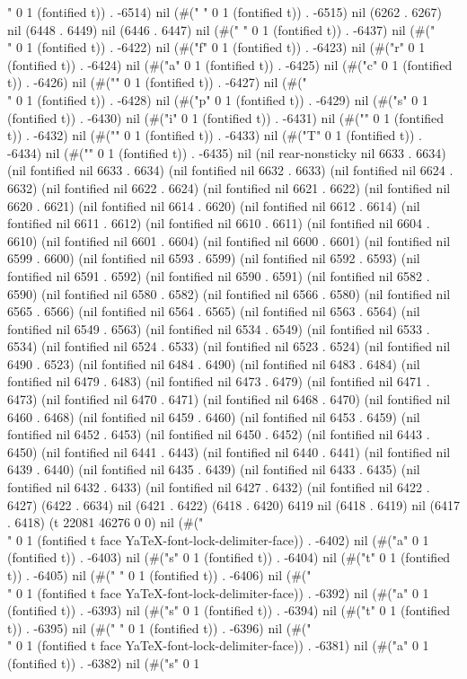 " 0 1 (fontified t)) . -6514) nil (#(" " 0 1 (fontified t)) . -6515) nil (6262 . 6267) nil (6448 . 6449) nil (6446 . 6447) nil (#("
" 0 1 (fontified t)) . -6437) nil (#("\\" 0 1 (fontified t)) . -6422) nil (#("f" 0 1 (fontified t)) . -6423) nil (#("r" 0 1 (fontified t)) . -6424) nil (#("a" 0 1 (fontified t)) . -6425) nil (#("c" 0 1 (fontified t)) . -6426) nil (#("{" 0 1 (fontified t)) . -6427) nil (#("\\" 0 1 (fontified t)) . -6428) nil (#("p" 0 1 (fontified t)) . -6429) nil (#("s" 0 1 (fontified t)) . -6430) nil (#("i" 0 1 (fontified t)) . -6431) nil (#("}" 0 1 (fontified t)) . -6432) nil (#("{" 0 1 (fontified t)) . -6433) nil (#("T" 0 1 (fontified t)) . -6434) nil (#("}" 0 1 (fontified t)) . -6435) nil (nil rear-nonsticky nil 6633 . 6634) (nil fontified nil 6633 . 6634) (nil fontified nil 6632 . 6633) (nil fontified nil 6624 . 6632) (nil fontified nil 6622 . 6624) (nil fontified nil 6621 . 6622) (nil fontified nil 6620 . 6621) (nil fontified nil 6614 . 6620) (nil fontified nil 6612 . 6614) (nil fontified nil 6611 . 6612) (nil fontified nil 6610 . 6611) (nil fontified nil 6604 . 6610) (nil fontified nil 6601 . 6604) (nil fontified nil 6600 . 6601) (nil fontified nil 6599 . 6600) (nil fontified nil 6593 . 6599) (nil fontified nil 6592 . 6593) (nil fontified nil 6591 . 6592) (nil fontified nil 6590 . 6591) (nil fontified nil 6582 . 6590) (nil fontified nil 6580 . 6582) (nil fontified nil 6566 . 6580) (nil fontified nil 6565 . 6566) (nil fontified nil 6564 . 6565) (nil fontified nil 6563 . 6564) (nil fontified nil 6549 . 6563) (nil fontified nil 6534 . 6549) (nil fontified nil 6533 . 6534) (nil fontified nil 6524 . 6533) (nil fontified nil 6523 . 6524) (nil fontified nil 6490 . 6523) (nil fontified nil 6484 . 6490) (nil fontified nil 6483 . 6484) (nil fontified nil 6479 . 6483) (nil fontified nil 6473 . 6479) (nil fontified nil 6471 . 6473) (nil fontified nil 6470 . 6471) (nil fontified nil 6468 . 6470) (nil fontified nil 6460 . 6468) (nil fontified nil 6459 . 6460) (nil fontified nil 6453 . 6459) (nil fontified nil 6452 . 6453) (nil fontified nil 6450 . 6452) (nil fontified nil 6443 . 6450) (nil fontified nil 6441 . 6443) (nil fontified nil 6440 . 6441) (nil fontified nil 6439 . 6440) (nil fontified nil 6435 . 6439) (nil fontified nil 6433 . 6435) (nil fontified nil 6432 . 6433) (nil fontified nil 6427 . 6432) (nil fontified nil 6422 . 6427) (6422 . 6634) nil (6421 . 6422) (6418 . 6420) 6419 nil (6418 . 6419) nil (6417 . 6418) (t 22081 46276 0 0) nil (#("\\" 0 1 (fontified t face YaTeX-font-lock-delimiter-face)) . -6402) nil (#("a" 0 1 (fontified t)) . -6403) nil (#("s" 0 1 (fontified t)) . -6404) nil (#("t" 0 1 (fontified t)) . -6405) nil (#(" " 0 1 (fontified t)) . -6406) nil (#("\\" 0 1 (fontified t face YaTeX-font-lock-delimiter-face)) . -6392) nil (#("a" 0 1 (fontified t)) . -6393) nil (#("s" 0 1 (fontified t)) . -6394) nil (#("t" 0 1 (fontified t)) . -6395) nil (#(" " 0 1 (fontified t)) . -6396) nil (#("\\" 0 1 (fontified t face YaTeX-font-lock-delimiter-face)) . -6381) nil (#("a" 0 1 (fontified t)) . -6382) nil (#("s" 0 1 